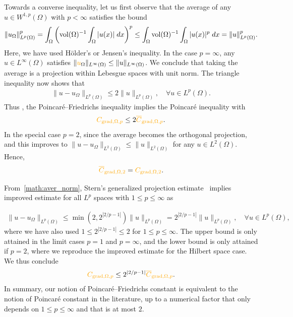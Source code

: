 \documentclass[10pt,letterpaper]{article}
\newcommand\cye[1]{%
  \protect\leavevmode
  \begingroup
    \color{red!35!yellow}%
    #1%
  \endgroup
}
\begin{document}
Towards a converse inequality, 
let us first observe that the average of any $u \in W^{1,p}(\Omega)$ with $p < \infty$ satisfies the bound 
\begin{align} \label{math:aver_norm}
    \| u_\Omega \|_{L^{p}(\Omega)}^{p}
    = 
    \int_{\Omega} \left( \operatorname{vol}(\Omega)^{-1} \int_{\Omega} |u(x)| \;dx \right)^{p}
    \leq 
    \int_{\Omega} \operatorname{vol}(\Omega)^{-1} \int_{\Omega} |u(x)|^{p} \;dx
    = 
    \| u \|_{L^{p}(\Omega)}^{p}
    .
\end{align}
Here, we have used H\"older's or Jensen's inequality. 
In the case $p = \infty$, any $u \in L^{\infty}(\Omega)$ satisfies $\| \cye{u}_\Omega \|_{L^{\infty}(\Omega)} \leq \| u \|_{L^{\infty}(\Omega)}$. 
We conclude that taking the average is a projection within Lebesgue spaces with unit norm. 
The triangle inequality now shows that 
\begin{align*}
    \| u - u_\Omega \|_{L^{p}(\Omega)} 
    \leq
    2
    \| u \|_{L^{p}(\Omega)},
    \quad 
    \forall
    u \in L^{p}(\Omega)
    .
\end{align*}
\cye{Thus}, the Poincar\'e--Friedrichs inequality implies the Poincar\'e inequality with 
\begin{align*}
    \cye{C_{\grad,\Omega,p}} \leq 2 \cye{\overline C_{\grad,\Omega,p}}.
\end{align*}
In the special case $p=2$, since the average \cye{becomes the} orthogonal projection, and this improves to $\| u - u_\Omega \|_{L^{2}(\Omega)} \leq \| u \|_{L^{2}(\Omega)}$ for any $u \in L^{2}(\Omega)$. Hence,
\begin{align*}
    \cye{\overline C_{\grad,\Omega,2}} = \cye{C_{\grad,\Omega,2}}. 
\end{align*}

\cye{From~\eqref{math:aver_norm},} Stern's generalized projection estimate~\cite[Theorem~4.1, Remark~5.1]{stern2015banach} implies improved estimate for all $L^{p}$ spaces with $1 \leq p \leq \infty$ \cye{as}
\begin{align*}
    \| u - u_\Omega \|_{L^{p}(\Omega)}
    \leq 
    \min\left( 2, 2^{|2/p-1|} \right)
    \| u \|_{L^{p}(\Omega)}
    = 
    2^{|2/p-1|} 
    \| u \|_{L^{p}(\Omega)}
    ,
    \quad 
    \forall 
    u \in L^{p}(\Omega)
    ,
\end{align*}
\cye{where we have also used} $1 \leq 2^{|2/p-1|} \leq 2$ for $1 \leq p \leq \infty$.
The upper bound is only attained in the limit cases $p = 1$ and $p = \infty$, and the lower bound is only attained if $p = 2$, where we reproduce the improved estimate for the Hilbert space case.
We thus conclude 
\begin{align}\label{math:p_vs_pf}
    \cye{C_{\grad,\Omega,p}} \leq 2^{|2/p-1|} \cye{\overline C_{\grad,\Omega,p}}.
\end{align}
In summary, our notion of Poincar\'e--Friedrichs constant is equivalent to the notion of Poincar\'e constant in the literature, up to a numerical factor that only depends on $1 \leq p \leq \infty$ and that is at most $2$.
\end{document}
